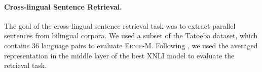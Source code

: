\documentclass[11pt]{article}
\begin{document}
\begin{table}[!t]
\centering

\vskip 0.1in

\caption{Evaluation results on PAWS-X. The results of \textsc{Ernie-M} are averaged over five runs. Results with ``'' and ``'' are from \cite{hu2020xtreme} and \cite{luo2020veco}, respectively.}
\label{table3.1}
\vskip -0.1in
\end{table}

\paragraph{Cross-lingual Sentence Retrieval.} The goal of the cross-lingual sentence retrieval task was to extract parallel sentences from bilingual corpora. We used a subset of the Tatoeba \cite{hu2020xtreme} dataset,  which contains 36 language pairs to evaluate \textsc{Ernie-M}. Following \citealt{luo2020veco}, we used the averaged representation in the middle layer of the best XNLI model to evaluate the retrieval task.
\end{document}
